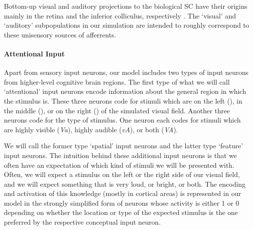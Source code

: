         Bottom-up visual and auditory projections to the biological \ac{SC} have their origins mainly in the retina and the inferior colliculus, respectively \citep{may-2005,stein-et-al-2014}.
        The `visual' and `auditory' subpopulations in our simulation are intended to roughly correspond to these unisensory sources of afferrents.

    \paragraph{Attentional Input}
        Apart from sensory input neurons, our model includes two types of input neurons from higher-level cognitive brain regions.
        The first type of what we will call `attentional' input neurons encode information about the general region in which the stimulus is.
        These three neurons code for stimuli which are on the left (\clLeft), in the middle (\clCenter), or on the right (\clRight) of the simulated visual field.
        Another three neurons code for the type of stimulus.
        One neuron each codes for stimuli which are highly visible (\textit{Va}), highly audible (\textit{vA}), or both (\textit{VA}).

        We will call the former type `spatial' input neurons and the latter type `feature' input neurons.
        The intuition behind these additional input neurons is that we often have an expectation of which kind of stimuli we will be presented with.
        Often, we will expect a stimulus on the left or the right side of our visual field, and we will expect something that is very loud, or bright, or both.
        The encoding and activation of this knowledge (mostly in cortical areas) is represented in our model in the strongly simplified form of neurons whose activity is either 1 or 0 depending on whether the location or type of the expected stimulus is the one preferred by the respective conceptual input neuron.

